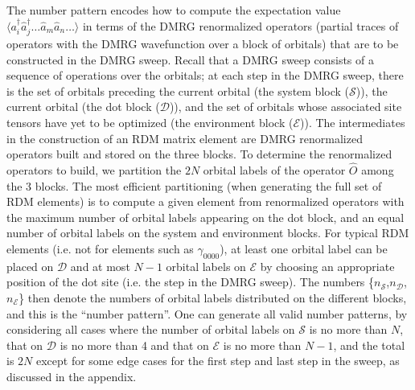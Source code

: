 The number pattern encodes how to compute the expectation value $\langle {a}^\dagger_i\hat{a}^\dagger_j\dots \hat{a}_m\hat{a}_n\dots \rangle$
in terms of the DMRG renormalized operators (partial traces of operators with the DMRG wavefunction over a block of orbitals) that
are to be constructed in the DMRG sweep. 
Recall that a DMRG sweep consists of a sequence of operations over the orbitals; at each step in the DMRG sweep, there is the set of
orbitals  preceding the current orbital (the system block ($\mathcal{S}$)), the current orbital (the dot block ($\mathcal{D}$)), and the set of orbitals whose
associated site tensors have
yet to be optimized (the environment block ($\mathcal{E}$)). The intermediates in
the  construction of an RDM matrix element
are DMRG renormalized operators  built and stored on the three blocks. 
To determine the renormalized operators to build, we partition the $2N$ orbital labels of the operator $\hat{O}$ 
among the 3 blocks. The most efficient partitioning (when generating
the full set of RDM elements) is to compute a given element from renormalized operators with
the maximum number of orbital labels appearing on the dot block, and an
equal number of  orbital labels on the system and environment blocks. 
For typical RDM elements (i.e. not for elements such as $\gamma_{0000}$), at least one orbital label can be placed on $\mathcal{D}$ and at most $N-1$ orbital labels on $\mathcal{E}$ by choosing an appropriate position of the dot site (i.e. the step in the DMRG sweep). 
The numbers \{$n_\mathcal{S}$,$n_\mathcal{D}$,$n_\mathcal{E}$\} then denote the numbers of orbital labels distributed on the different blocks, and this
is the ``number pattern''. One can generate all valid number patterns, by considering all cases where the number of orbital labels on $\mathcal{S}$ is no more than $N$, that on $\mathcal{D}$ is no more than 4 and that on $\mathcal{E}$ is no more than $N-1$, and the total is $2N$ except for some edge cases for the first step and last step in the sweep, as discussed in the appendix.



